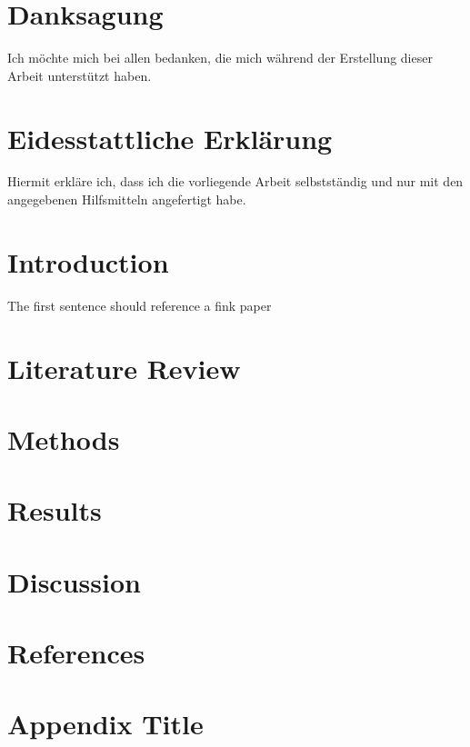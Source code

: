 \documentclass[man]{apa7}
\begin{document}
\newpage
\section*{Danksagung}
Ich möchte mich bei allen bedanken, die mich während der Erstellung dieser Arbeit unterstützt haben.

\newpage
\section*{Eidesstattliche Erklärung}
Hiermit erkläre ich, dass ich die vorliegende Arbeit selbstständig und nur mit den angegebenen Hilfsmitteln angefertigt habe.

\newpage
\tableofcontents
\newpage

\newpage
\section{Introduction}
The first sentence should reference a fink paper \cite{Fink2021}
\lipsum[1-4] %

\section{Literature Review}
\lipsum[5-8]

\section{Methods}
\lipsum[9-12]

\section{Results}
\lipsum[13-16]

\section{Discussion}
\lipsum[17-20]

\newpage
\section*{References}
\printbibliography

\appendix
\section{Appendix Title}
\lipsum[21-23]
\end{document}
